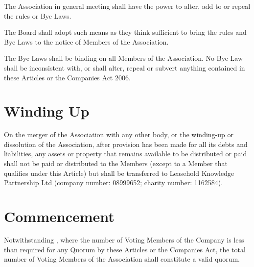 \documentclass[10pt]{mk-articles-of-association}
\newcommand{\EC}[0]{Board}
\newcommand{\Exec}[0]{\EC{} }
\begin{document}
\begin{constenum}
\item The Association in general meeting shall have the power to
  alter, add to or repeal the rules or Bye Laws.

\item The \Exec shall adopt such means as they think sufficient to
  bring the rules and Bye Laws to the notice of Members of the Association.

\item The Bye Laws shall be binding on all Members of the
  Association. No Bye Law shall be inconsistent with, or shall
  alter, repeal or subvert anything contained in these Articles or
  the Companies Act 2006.
\end{constenum}



\section{Winding Up}

On the merger of the Association with any other body, or the
  winding-up or dissolution of the Association, after provision has
  been made for all its debts and liabilities, any assets or property
  that remains available to be distributed or paid shall not be paid
  or distributed to the Members (except to a Member that qualifies
  under this Article) but shall be transferred to Leasehold Knowledge
  Partnership Ltd (company number: 08999652; charity number: 1162584).



\section{Commencement}

\begin{constenum}

  \item Notwithstanding , where the number of
    Voting Members of the Company is less than required for any Quorum
    by these Articles or the Companies Act, the total number of Voting
    Members of the Association shall constitute a valid quorum.

\end{constenum}
\end{document}
